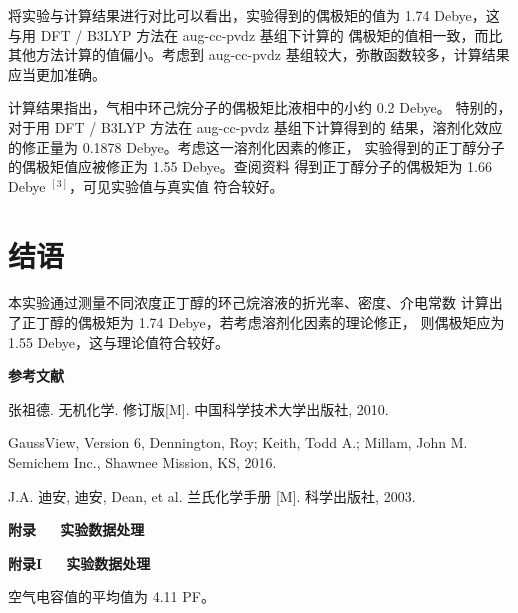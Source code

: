 \documentclass[12pt]{ctexart}
\numberwithin{equation}{section}
\begin{document}
将实验与计算结果进行对比可以看出，实验得到的偶极矩的值为 1.74
Debye，这与用 DFT / B3LYP 方法在 aug-cc-pvdz 基组下计算的
偶极矩的值相一致，而比其他方法计算的值偏小。考虑到 aug-cc-pvdz
基组较大，弥散函数较多，计算结果应当更加准确。

计算结果指出，气相中环己烷分子的偶极矩比液相中的小约 0.2 Debye。
特别的，对于用 DFT / B3LYP 方法在 aug-cc-pvdz 基组下计算得到的
结果，溶剂化效应的修正量为 0.1878 Debye。考虑这一溶剂化因素的修正，
实验得到的正丁醇分子的偶极矩值应被修正为 1.55 Debye。查阅资料
得到正丁醇分子的偶极矩为 1.66 Debye $^{[3]}$，可见实验值与真实值
符合较好。

\section{结语}

本实验通过测量不同浓度正丁醇的环己烷溶液的折光率、密度、介电常数
计算出了正丁醇的偶极矩为 1.74 Debye，若考虑溶剂化因素的理论修正，
则偶极矩应为 1.55 Debye，这与理论值符合较好。

\begin{center}
    \Large\bfseries{参考文献}
\end{center}
\noindent
[1] 张祖德. 无机化学. 修订版[M]. 中国科学技术大学出版社, 2010.

\noindent
[2] GaussView, Version 6, Dennington, Roy; Keith, Todd A.;
Millam, John M. Semichem Inc., Shawnee Mission, KS, 2016.

\noindent
[3] J.A. 迪安, 迪安, Dean, et al. 兰氏化学手册 [M]. 科学出版社,
2003.

\newpage

\begin{center}
    \LARGE\bfseries{附录~~~实验数据处理}
\end{center}
\begin{center}
    \Large\bfseries{附录I~~~实验数据处理}
\end{center}

空气电容值的平均值为 4.11 PF。
\end{document}

